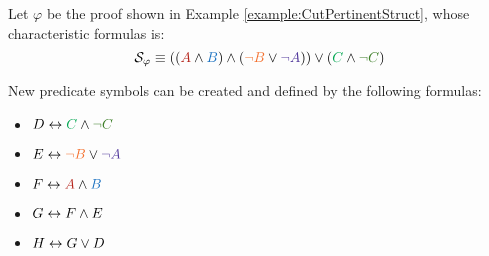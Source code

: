 \begin{example}
\label{example:PlusTimesDefinitionalNormalization}
Let $\varphi$ be the proof shown in Example \ref{example:CutPertinentStruct}, whose characteristic formulas is:
$$
\struct{\varphi} 
\equiv 
((\hA{A} \structplus \hB{B}) \structplus (\hC{\structdual{B}} \structtimes \hD{\structdual{A}}))
\structtimes
(\hE{C} \structplus \hF{\structdual{C}})
$$

\noindent
New predicate symbols can be created and defined by the following formulas: 
\begin{itemize}
\item $D \biimp \hE{C} \structplus \hF{\structdual{C}}$

\item $E \biimp \hC{\structdual{B}} \structtimes \hD{\structdual{A}}$

\item $F \biimp \hA{A} \structplus \hB{B}$

\item $G \leftrightarrow F \wedge E$

\item $H \leftrightarrow G \vee D$
\end{itemize}


\end{example}
